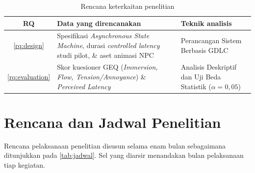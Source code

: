 \begin{table}[H]
    \centering
    \caption{Rencana keterkaitan penelitian}
    \label{tab:linkageproposal}
    \small
    \begin{tabularx}{\linewidth}{|c|X|X|}
        \hline
        \textbf{RQ} & \textbf{Data yang direncanakan} & \textbf{Teknik analisis} \\ \hline
        \cref{rq:design}    & Spesifikasi \textit{Asynchronous State Machine}, durasi \textit{controlled latency} studi pilot, \& aset animasi NPC & Perancangan Sistem Berbasis GDLC \\ \hline
        \cref{rq:evaluation} & Skor kuesioner GEQ (\textit{Immersion, Flow, Tension/Annoyance}) \& \textit{Perceived Latency} & Analisis Deskriptif dan Uji Beda Statistik ($\alpha = 0,05$) \\ \hline
    \end{tabularx}
\end{table}

\section{Rencana dan Jadwal Penelitian}
Rencana pelaksanaan penelitian disusun selama enam bulan sebagaimana ditunjukkan pada \cref{tab:jadwal}. Sel yang diarsir menandakan bulan pelaksanaan tiap kegiatan.

